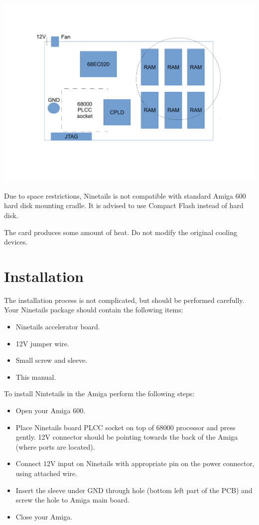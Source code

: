 \documentclass[10pt,a4paper]{article}
\begin{document}
\begin{center}
\includegraphics[scale=0.5]{ninetails-drawing.pdf}
\end{center}

Due to space restrictions, Ninetails is not compatible with standard Amiga 600 hard disk mounting cradle. It is advised to use Compact Flash instead of hard disk. 

The card produces some amount of heat. Do not modify the original cooling devices.

\section*{Installation}

The installation process is not complicated, but should be performed carefully. Your Ninetails package should contain the following items:

\begin{itemize}
	\item Ninetails accelerator board.
	\item 12V jumper wire.
	\item Small screw and sleeve.
	\item This manual.
\end{itemize}

To install Nintetails in the Amiga perform the following steps:

\begin{itemize}
	\item Open your Amiga 600.
	\item Place Ninetails board PLCC socket on top of 68000 processor and press gently. 12V connector should be pointing towards the back of the Amiga (where ports are located).
	\item Connect 12V input on Ninetails with appropriate pin on the power connector, using attached wire.
	\item Insert the sleeve under GND through hole (bottom left part of the PCB) and screw the hole to Amiga main board.
	\item Close your Amiga.
\end{itemize}
\end{document}
